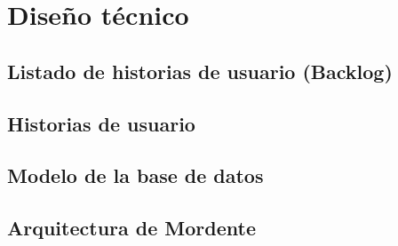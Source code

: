 \chapter{Diseño técnico}

\section{Listado de historias de usuario (Backlog)}

\section{Historias de usuario}

\section{Modelo de la base de datos}

\section{Arquitectura de Mordente}
